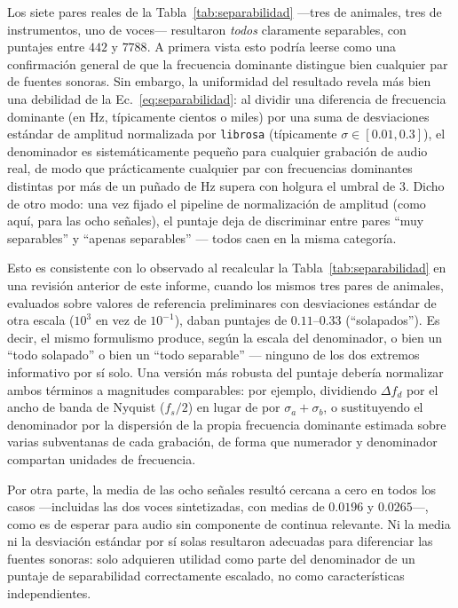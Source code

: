 Los siete pares reales de la Tabla~\ref{tab:separabilidad} —tres de animales, tres de instrumentos, uno de voces— resultaron \emph{todos} claramente separables, con puntajes entre $442$ y $7788$. A primera vista esto podría leerse como una confirmación general de que la frecuencia dominante distingue bien cualquier par de fuentes sonoras. Sin embargo, la uniformidad del resultado revela más bien una debilidad de la Ec.~\ref{eq:separabilidad}: al dividir una diferencia de frecuencia dominante (en Hz, típicamente cientos o miles) por una suma de desviaciones estándar de amplitud normalizada por \texttt{librosa} (típicamente $\sigma \in [0.01, 0.3]$), el denominador es sistemáticamente pequeño para cualquier grabación de audio real, de modo que prácticamente cualquier par con frecuencias dominantes distintas por más de un puñado de Hz supera con holgura el umbral de $3$. Dicho de otro modo: una vez fijado el pipeline de normalización de amplitud (como aquí, para las ocho señales), el puntaje deja de discriminar entre pares ``muy separables'' y ``apenas separables'' — todos caen en la misma categoría.

Esto es consistente con lo observado al recalcular la Tabla~\ref{tab:separabilidad} en una revisión anterior de este informe, cuando los mismos tres pares de animales, evaluados sobre valores de referencia preliminares con desviaciones estándar de otra escala ($10^{3}$ en vez de $10^{-1}$), daban puntajes de $0.11$--$0.33$ (``solapados''). Es decir, el mismo formulismo produce, según la escala del denominador, o bien un ``todo solapado'' o bien un ``todo separable'' — ninguno de los dos extremos informativo por sí solo. Una versión más robusta del puntaje debería normalizar ambos términos a magnitudes comparables: por ejemplo, dividiendo $\Delta f_d$ por el ancho de banda de Nyquist ($f_s/2$) en lugar de por $\sigma_a+\sigma_b$, o sustituyendo el denominador por la dispersión de la propia frecuencia dominante estimada sobre varias subventanas de cada grabación, de forma que numerador y denominador compartan unidades de frecuencia.

Por otra parte, la media de las ocho señales resultó cercana a cero en todos los casos —incluidas las dos voces sintetizadas, con medias de $0.0196$ y $0.0265$—, como es de esperar para audio sin componente de continua relevante. Ni la media ni la desviación estándar por sí solas resultaron adecuadas para diferenciar las fuentes sonoras: solo adquieren utilidad como parte del denominador de un puntaje de separabilidad correctamente escalado, no como características independientes.

